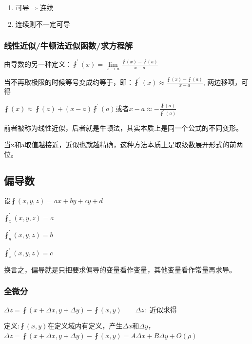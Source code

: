 \documentclass[UTF8]{ctexbook}
\newcommand{\limNormal}[1]{\lim\limits_{#1}}
\newcommand{\derivative}{^\prime}
\newcommand{\partialDerivative}[1]{^\prime_{#1}}
\newcommand{\myRightArrow}{$\Rightarrow$}
\newcommand{\fDerivative}[1]{\fint\derivative(#1)}
\newcommand{\defFunction}[1]{\fint(#1)}
\begin{document}
{{{\begin{enumerate}
    \item 可导\myRightArrow 连续

    \item 连续则不一定可导
  \end{enumerate}

  \subsubsection{线性近似/牛顿法近似函数/求方程解}{
    由导数的另一种定义：$\fDerivative{x} = \limNormal{x \to a}\frac{\defFunction{x} - \defFunction{a}}{x - a}$

    当不再取极限的时候等号变成约等于，即：$\fDerivative{x} \approx \frac{\defFunction{x} - \defFunction{a}}{x - a}$, 两边移项，可得

    $\defFunction{x} \approx \defFunction{a} + (x-a)\fDerivative{a}$或者$x - a \approx -\frac{\defFunction{a}}{\fDerivative{a}}$

    前者被称为线性近似，后者就是牛顿法，其实本质上是同一个公式的不同变形。

    当x和a取值越接近，近似也就越精确，这种方法本质上是取级数展开形式的前两位。

  }%

}%

\subsection{偏导数}{

  设$\defFunction{x,y,z} = ax + by + cy + d$

  $\fint\partialDerivative{x}(x,y,z) = a$

  $\fint\partialDerivative{y}(x,y,z) = b$

  $\fint\partialDerivative{z}(x,y,z) = c$

  换言之，偏导就是只把要求偏导的变量看作变量，其他变量看作常量再求导。

  \subsubsection{全微分}{

    $\Delta z = \defFunction{x + \Delta x,y + \Delta y} - \defFunction{x,y}\qquad\Delta z : $ 近似求得

    定义:$\defFunction{x,y}$在定义域内有定义，产生$\Delta x$和$\Delta y$，$\Delta z = \defFunction{x + \Delta x,y + \Delta y} - \defFunction{x,y} = A\Delta x + B\Delta y + O(\rho)$

}}}}
\end{document}
